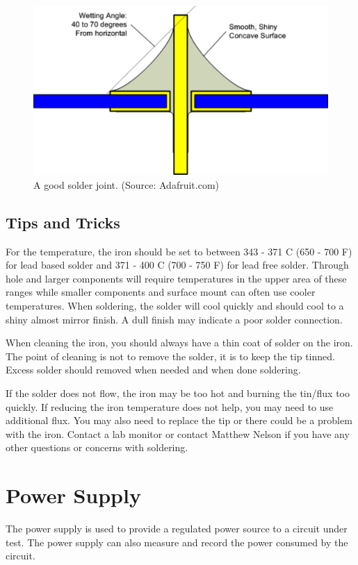 \begin{figure}[ht]
\centering
\includegraphics[width=4.5in]{images/tools_Solder_Joint.pdf}
\caption{A good solder joint. (Source: Adafruit.com)}
\label{fig:good_solder}
\end{figure}

\subsection{Tips and Tricks}
For the temperature, the iron should be set to between 343 - 371 C (650 - 700 F) for lead based solder and 371 - 400 C (700 - 750 F) for lead free solder.  Through hole and larger components will require temperatures in the upper area of these ranges while smaller components and surface mount can often use cooler temperatures.  When soldering, the solder will cool quickly and should cool to a shiny almost mirror finish.  A dull finish may indicate a poor solder connection.

When cleaning the iron, you should always have a thin coat of solder on the iron.  The point of cleaning is not to remove the solder, it is to keep the tip tinned.  Excess solder should removed when needed and when done soldering.

If the solder does not flow, the iron may be too hot and burning the tin/flux too quickly. If reducing the iron temperature does not help, you may need to use additional flux. You may also need to replace the tip or there could be a problem with the iron.  Contact a lab monitor or contact Matthew Nelson if you have any other questions or concerns with soldering.

\section{Power Supply}\label{power_supply}
The power supply is used to provide a regulated power source to a circuit under test. The power supply can also measure and record the power consumed by the circuit.

